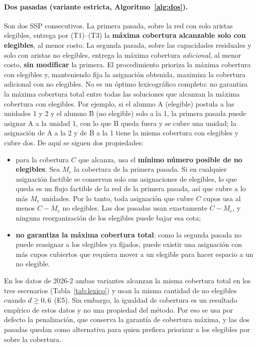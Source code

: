 \documentclass{article}
\begin{document}
\paragraph{Dos pasadas (variante estricta, Algoritmo~\ref{alg:dos}).} Son dos SSP consecutivos. La primera pasada, sobre la red con solo aristas elegibles, entrega por (T1)--(T3) la \textbf{máxima cobertura alcanzable solo con elegibles}, al menor costo. La segunda pasada, sobre las capacidades residuales y solo con aristas no elegibles, entrega la máxima cobertura \emph{adicional}, al menor costo, \textbf{sin modificar} la primera. El procedimiento prioriza la máxima cobertura con elegibles y, manteniendo fija la asignación obtenida, maximiza la cobertura adicional con no elegibles. No es un óptimo lexicográfico completo: no garantiza la máxima cobertura total entre todas las soluciones que alcanzan la máxima cobertura con elegibles. Por ejemplo, si el alumno A (elegible) postula a las unidades 1 y 2 y el alumno B (no elegible) solo a la 1, la primera pasada puede asignar A a la unidad 1, con lo que B queda fuera y se cubre una unidad; la asignación de A a la 2 y de B a la 1 tiene la misma cobertura con elegibles y cubre dos. De aquí se siguen dos propiedades:
\begin{itemize}
    \item para la cobertura $C$ que alcanza, usa el \textbf{mínimo número posible de no elegibles}. Sea $M_e$ la cobertura de la primera pasada. Si en cualquier asignación factible se conservan solo sus asignaciones de elegibles, lo que queda es un flujo factible de la red de la primera pasada, así que cubre a lo más $M_e$ unidades. Por lo tanto, toda asignación que cubre $C$ cupos usa al menos $C - M_e$ no elegibles. Las dos pasadas usan exactamente $C - M_e$, y ninguna reorganización de los elegibles puede bajar esa cota;
    \item \textbf{no garantiza la máxima cobertura total}: como la segunda pasada no puede reasignar a los elegibles ya fijados, puede existir una asignación con más cupos cubiertos que requiera mover a un elegible para hacer espacio a un no elegible.
\end{itemize}
En los datos de 2026-2 ambas variantes alcanzan la misma cobertura total en los tres escenarios (Tabla~\ref{tab:lexico}) y usan la misma cantidad de no elegibles cuando $d \geq 0,6$ (E5). Sin embargo, la igualdad de cobertura es un resultado empírico de estos datos y no una propiedad del método. Por eso se usa por defecto la penalización, que conserva la garantía de cobertura máxima, y las dos pasadas quedan como alternativa para quien prefiera priorizar a los elegibles por sobre la cobertura.
\end{document}
